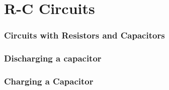 \documentclass[12pt,aspectratio=169]{beamer}
\newcommand{\pic}[2]{\texttt{[image: \#2]}}
\newcommand{\mb}[1]{\mathbf{#1}}
\newcommand{\eq}[2]{\vspace{#1}{\Large\begin{displaymath}#2\end{displaymath}}}
\begin{document}
\section{R-C Circuits}


\begin{frame}
  \frametitle{Circuits with Resistors and Capacitors}
\end{frame}


\begin{frame}
  \frametitle{Discharging a capacitor}
%    
%
%
\end{frame}



\begin{frame}
  \frametitle{Charging a Capacitor}
%
%
%
\end{frame}
\end{document}
